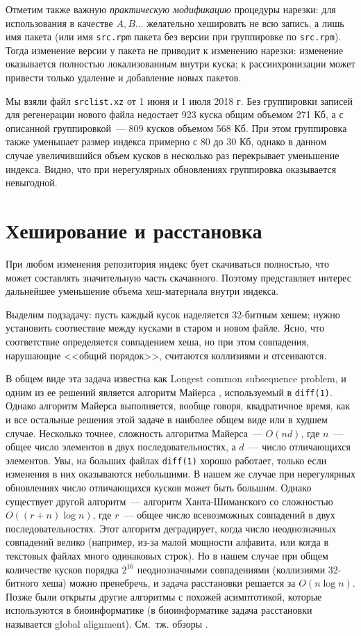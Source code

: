 \documentclass[russian,a4paper,12pt]{article}
\begin{document}
Отметим также важную \textit{практическую модификацию} процедуры нарезки: для использования в качестве $A, B\ldots$
желательно хешировать не всю запись, а лишь имя пакета (или имя \verb|src.rpm| пакета без версии при группировке по \verb|src.rpm|).
Тогда изменение версии у пакета не приводит к изменению нарезки: изменение оказывается полностью локализованным внутри куска;
к рассинхронизации может привести только удаление и добавление новых пакетов.

Мы взяли файл \verb|srclist.xz| от 1 июня и 1 июля 2018 г.  Без группировки записей для регенерации нового файла
недостает 923 куска общим объемом 271 Кб, а с описанной группировкой~--- 809 кусков объемом 568 Кб.  При этом группировка
также уменьшает размер индекса примерно с 80 до 30 Кб, однако в данном случае увеличившийся объем кусков в несколько
раз перекрывает уменьшение индекса.  Видно, что при нерегулярных обновлениях группировка оказывается невыгодной.

\section{Хеширование и расстановка}
При любом изменения репозитория индекс бует скачиваться полностью, что может составлять значительную часть скачанного.
Поэтому представляет интерес дальнейшее уменьшение объема хеш-материала внутри индекса.

Выделим подзадачу: пусть каждый кусок наделяется 32-битным хешем; нужно установить соотвествие между кусками в старом
и новом файле.  Ясно, что соответствие определяется совпадением хеша, но при этом совпадения, нарушающие <<общий порядок>>,
считаются коллизиями и отсеиваются.

В общем виде эта задача известна как Longest common subsequence problem, и одним из ее решений является алгоритм Майерса
\cite{myers}, используемый в \verb|diff(1)|.  Однако алгоритм Майерса выполняется, вообще говоря, квадратичное время,
как и все остальные решения этой задаче в наиболее общем виде или в худшем случае.  Несколько точнее, сложность алгоритма Майерса~---
$O(nd)$, где $n$~--- общее число элементов в двух последовательностях, а $d$~--- число отличающихся элементов.
Увы, на больших файлах \verb|diff(1)| хорошо работает, только если изменения в них оказываются небольшими.
В нашем же случае при нерегулярных обновлениях число отличающихся кусков может быть большим.
Однако существует другой алгоритм~--- алгоритм Ханта-Шиманского со сложностью $O((r+n)\log n)$, где $r$~--- общее число
всевозможных совпадений в двух последовательностях.  Этот алгоритм деградирует, когда число неоднозначных совпадений велико
(например, из-за малой мощности алфавита, или когда в текстовых файлах много одинаковых строк).  Но в нашем случае при общем
количестве кусков порядка $2^{16}$ неоднозначными совпадениями (коллизиями 32-битного хеша) можно пренебречь, и задача расстановки
решается за $O(n\log n)$.  Позже были открыты другие алгоритмы с похожей асимптотикой, которые используются в биоинформатике
\cite[с.\,291]{seq} (в биоинформатике задача расстановки называется global alignment).  См.~тж. обзоры \cite{survey,symposium}.
\end{document}
